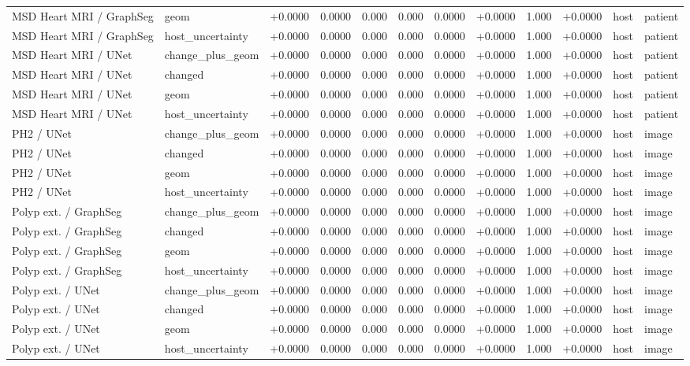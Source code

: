 \begin{table}[t]
\begin{tabular}{llllllllllll}
MSD Heart MRI / GraphSeg & geom & +0.0000 & 0.0000 & 0.000 & 0.000 & 0.0000 & +0.0000 & 1.000 & +0.0000 & host & patient \\
MSD Heart MRI / GraphSeg & host\_uncertainty & +0.0000 & 0.0000 & 0.000 & 0.000 & 0.0000 & +0.0000 & 1.000 & +0.0000 & host & patient \\
MSD Heart MRI / UNet & change\_plus\_geom & +0.0000 & 0.0000 & 0.000 & 0.000 & 0.0000 & +0.0000 & 1.000 & +0.0000 & host & patient \\
MSD Heart MRI / UNet & changed & +0.0000 & 0.0000 & 0.000 & 0.000 & 0.0000 & +0.0000 & 1.000 & +0.0000 & host & patient \\
MSD Heart MRI / UNet & geom & +0.0000 & 0.0000 & 0.000 & 0.000 & 0.0000 & +0.0000 & 1.000 & +0.0000 & host & patient \\
MSD Heart MRI / UNet & host\_uncertainty & +0.0000 & 0.0000 & 0.000 & 0.000 & 0.0000 & +0.0000 & 1.000 & +0.0000 & host & patient \\
PH2 / UNet & change\_plus\_geom & +0.0000 & 0.0000 & 0.000 & 0.000 & 0.0000 & +0.0000 & 1.000 & +0.0000 & host & image \\
PH2 / UNet & changed & +0.0000 & 0.0000 & 0.000 & 0.000 & 0.0000 & +0.0000 & 1.000 & +0.0000 & host & image \\
PH2 / UNet & geom & +0.0000 & 0.0000 & 0.000 & 0.000 & 0.0000 & +0.0000 & 1.000 & +0.0000 & host & image \\
PH2 / UNet & host\_uncertainty & +0.0000 & 0.0000 & 0.000 & 0.000 & 0.0000 & +0.0000 & 1.000 & +0.0000 & host & image \\
Polyp ext. / GraphSeg & change\_plus\_geom & +0.0000 & 0.0000 & 0.000 & 0.000 & 0.0000 & +0.0000 & 1.000 & +0.0000 & host & image \\
Polyp ext. / GraphSeg & changed & +0.0000 & 0.0000 & 0.000 & 0.000 & 0.0000 & +0.0000 & 1.000 & +0.0000 & host & image \\
Polyp ext. / GraphSeg & geom & +0.0000 & 0.0000 & 0.000 & 0.000 & 0.0000 & +0.0000 & 1.000 & +0.0000 & host & image \\
Polyp ext. / GraphSeg & host\_uncertainty & +0.0000 & 0.0000 & 0.000 & 0.000 & 0.0000 & +0.0000 & 1.000 & +0.0000 & host & image \\
Polyp ext. / UNet & change\_plus\_geom & +0.0000 & 0.0000 & 0.000 & 0.000 & 0.0000 & +0.0000 & 1.000 & +0.0000 & host & image \\
Polyp ext. / UNet & changed & +0.0000 & 0.0000 & 0.000 & 0.000 & 0.0000 & +0.0000 & 1.000 & +0.0000 & host & image \\
Polyp ext. / UNet & geom & +0.0000 & 0.0000 & 0.000 & 0.000 & 0.0000 & +0.0000 & 1.000 & +0.0000 & host & image \\
Polyp ext. / UNet & host\_uncertainty & +0.0000 & 0.0000 & 0.000 & 0.000 & 0.0000 & +0.0000 & 1.000 & +0.0000 & host & image \\
\bottomrule
\end{tabular}
\end{table}
